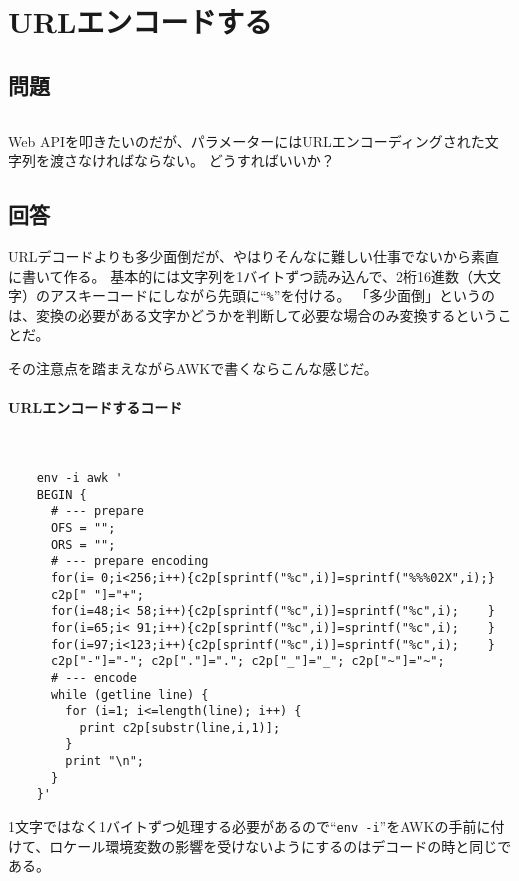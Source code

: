 \section{URLエンコードする}
\label{recipe:URL_encode}

\subsection*{問題}
\noindent
$\!\!\!\!\!$
\begin{grshfboxit}{160.0mm}
	Web APIを叩きたいのだが、パラメーターにはURLエンコーディングされた文字列を渡さなければならない。
	どうすればいいか？
\end{grshfboxit}

\subsection*{回答}
URLデコードよりも多少面倒だが、やはりそんなに難しい仕事でないから素直に書いて作る。
基本的には文字列を1バイトずつ読み込んで、2桁16進数（大文字）のアスキーコードにしながら先頭に``\verb|%|''を付ける。
「多少面倒」というのは、変換の必要がある文字かどうかを判断して必要な場合のみ変換するということだ。

その注意点を踏まえながらAWKで書くならこんな感じだ。

\paragraph{URLエンコードするコード} 　\\
\begin{frameboxit}{160.0mm}
\begin{verbatim}
	env -i awk '
	BEGIN {
	  # --- prepare
	  OFS = "";
	  ORS = "";
	  # --- prepare encoding
	  for(i= 0;i<256;i++){c2p[sprintf("%c",i)]=sprintf("%%%02X",i);}
	  c2p[" "]="+";
	  for(i=48;i< 58;i++){c2p[sprintf("%c",i)]=sprintf("%c",i);    }
	  for(i=65;i< 91;i++){c2p[sprintf("%c",i)]=sprintf("%c",i);    }
	  for(i=97;i<123;i++){c2p[sprintf("%c",i)]=sprintf("%c",i);    }
	  c2p["-"]="-"; c2p["."]="."; c2p["_"]="_"; c2p["~"]="~";
	  # --- encode
	  while (getline line) {
	    for (i=1; i<=length(line); i++) {
	      print c2p[substr(line,i,1)];
	    }
	    print "\n";
	  }
	}'
\end{verbatim}
\end{frameboxit}

1文字ではなく1バイトずつ処理する必要があるので``\verb|env -i|''をAWKの手前に付けて、ロケール環境変数の影響を受けないようにするのはデコードの時と同じである。

